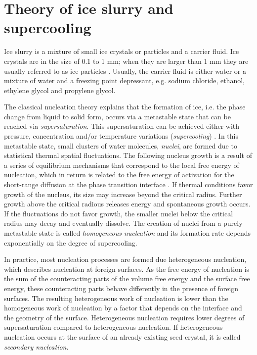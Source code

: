 
\section{Theory of ice slurry and supercooling}
\label{chapter_theory}

Ice slurry is a mixture of small ice crystals or particles and a carrier fluid. Ice crystals are in the size of 0.1 to 1 mm; when they are larger than 1 mm they are usually referred to as ice particles \citep{kauffeld_ice_2010}.
Usually, the carrier fluid is either water or a mixture of water and a freezing point depressant, e.g. sodium chloride, ethanol, ethylene glycol and propylene glycol. 


The classical nucleation theory \citep{turnbull_rate_1949} explains that the formation of ice, i.e. the phase change from liquid to solid form, occurs via a metastable state that can be reached via \emph{supersaturation}. This supersaturation can be achieved either with pressure, concentration and/or temperature variations (\emph{supercooling}) \citep{kauffeld_handbooks_2005}. In this metastable state, small clusters of water molecules, \emph{nuclei}, are formed due to statistical thermal spatial fluctuations. The following nucleus growth is a result of a series of equilibrium mechanisms that correspond to the local free energy of nucleation, which in return is related to the free energy of activation for the short-range diffusion at the phase transition interface \citep{turnbull_rate_1949}. If thermal conditions favor growth of the nucleus, its size may increase beyond the critical radius. Further growth above the critical radious releases energy and spontaneous growth occurs. If the fluctuations do not favor growth, the smaller nuclei below the critical radius may decay and eventually dissolve. The creation of nuclei from a purely metastable state is called \emph{homogeneous nucleation} and its formation rate depends exponentially on the degree of supercooling. 

In practice, most nucleation processes are formed due heterogeneous nucleation, which describes nucleation at foreign surfaces. As the free energy of nucleation is the sum of the counteracting parts of the volume free energy and the surface free energy, these counteracting parts behave differently in the presence of foreign surfaces. The resulting heterogeneous work of nucleation  is lower than the homogeneous work of nucleation by a factor that depends on the interface and the geometry of the surface. Heterogeneous nucleation requires lower degrees of supersaturation compared to heterogeneous nucleation. If heterogeneous nucleation occurs at the surface of an already existing seed crystal, it is called \emph{secondary nucleation}.

